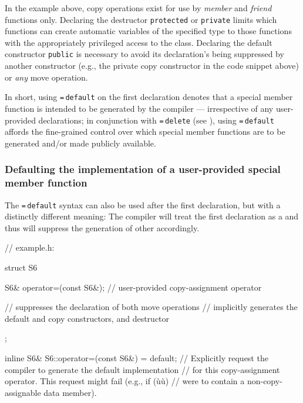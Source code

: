 \noindent In the example above, copy operations exist for use by \emph{member} and
\emph{friend} functions only. Declaring the destructor
\lstinline!protected! or \lstinline!private! limits which functions can create
automatic variables of the specified type to those functions with the
appropriately privileged access to the class. Declaring the default
constructor \lstinline!public! is necessary to avoid its declaration's
being suppressed by another constructor (e.g., the private copy
constructor in the code snippet above) or \emph{any} move operation.

In short, using \lstinline!=!\,\lstinline!default! on the first declaration
denotes that a special member function is intended to be generated by
the compiler --- irrespective of any user-provided declarations; in
conjunction with {\lstinline!=!\,\lstinline!delete!} (see ),
using
\lstinline!=!\,\lstinline!default! affords the fine-grained control over which
special member functions are to be generated and/or made publicly
available.

\subsubsection[Defaulting the implementation of a user-provided special member function]{Defaulting the implementation of a user-provided special member function}\label{defaulting-the-implementation-of-a-user-provided-special-member-function}

The \lstinline!=!\,\lstinline!default! syntax can also be used after the first
declaration, but with a distinctly different meaning: The compiler will
treat the first declaration as a  and thus will suppress the generation of other
 accordingly.

\begin{emcppslisting}[language=C++,label=default-exampleh-code]
// example.h:

struct S6
{
    S6& operator=(const S6&);  // user-provided copy-assignment operator

    // suppresses the declaration of both move operations
    // implicitly generates the default and copy constructors, and destructor
};

inline S6& S6::operator=(const S6&) = default;
    // Explicitly request the compiler to generate the default implementation
    // for this copy-assignment operator. This request might fail (e.g., if (ù{}ù)
    // were to contain a non-copy-assignable data member).
\end{emcppslisting}

